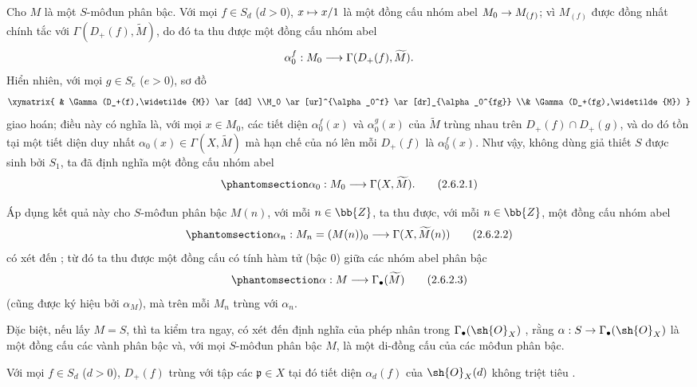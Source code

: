 \documentclass[oneside,10pt]{amsart}
\makeatletter
\newcommand{\ega@arrow}[2]{\mathchoice{#1}{#2}{#2}{#2}}
\let\ega@shortmapsto\mapsto
\renewcommand{\to}{\ega@arrow{\longrightarrow}{\rightarrow}}
\renewcommand{\mapsto}{\ega@arrow{\longmapsto}{\ega@shortmapsto}}
\newcommand{\oldpage}[2][]{\marginnote{\normalfont\footnotesize\textbf{#1}~|~#2}\ignorespaces}
\let\EGAOriginalLabel\label
\renewcommand{\label}[1]{\phantomsection\EGAOriginalLabel{#1}}
\makeatother
\begin{document}
\begin{env}[2.6.2]
\label{II.2.6.2}
Cho $M$ là một $S$-môđun phân bậc.
Với mọi $f\in S_d$ ($d>0$), $x\mapsto x/1$ là một đồng cấu nhóm abel $M_0\to M_{(f)}$; vì $M_{(f)}$ được đồng nhất chính tắc
\oldpage[II]{37}
với $\Gamma(D_+(f),\widetilde{M})$, do đó ta thu được một đồng cấu nhóm abel
\[
  \alpha_0^f:M_0\to\Gamma(D_+(f),\widetilde{M}).
\]
Hiển nhiên, với mọi $g\in S_e$ ($e>0$), sơ đồ
\[
  \xymatrix{
    & \Gamma(D_+(f),\widetilde{M}) \ar[dd]
  \\M_0 \ar[ur]^{\alpha_0^f} \ar[dr]_{\alpha_0^{fg}}
  \\& \Gamma(D_+(fg),\widetilde{M})
  }
\]
giao hoán; điều này có nghĩa là, với mọi $x\in M_0$, các tiết diện $\alpha_0^f(x)$ và $\alpha_0^g(x)$ của $\widetilde{M}$ trùng nhau trên $D_+(f)\cap D_+(g)$, và do đó tồn tại một tiết diện duy nhất $\alpha_0(x)\in\Gamma(X,\widetilde{M})$ mà hạn chế của nó lên mỗi $D_+(f)$ là $\alpha_0^f(x)$.
Như vậy, không dùng giả thiết $S$ được sinh bởi $S_1$, ta đã định nghĩa một đồng cấu nhóm abel
\[
\label{II.2.6.2.1}
  \alpha_0:M_0\to\Gamma(X,\widetilde{M}).
\tag{2.6.2.1}
\]

Áp dụng kết quả này cho $S$-môđun phân bậc $M(n)$, với mỗi $n\in\bb{Z}$, ta thu được, với mỗi $n\in\bb{Z}$, một đồng cấu nhóm abel
\[
\label{II.2.6.2.2}
  \alpha_n:M_n=(M(n))_0\to\Gamma(X,\widetilde{M}(n))
\tag{2.6.2.2}
\]
có xét đến ; từ đó ta thu được một đồng cấu có tính hàm tử (bậc $0$) giữa các nhóm abel phân bậc
\[
\label{II.2.6.2.3}
  \alpha:M\to\Gamma_\bullet(\widetilde{M})
\tag{2.6.2.3}
\]
(cũng được ký hiệu bởi $\alpha_M$), mà trên mỗi $M_n$ trùng với $\alpha_n$.

Đặc biệt, nếu lấy $M=S$, thì ta kiểm tra ngay, có xét đến định nghĩa của phép nhân trong $\Gamma_\bullet(\sh{O}_X)$ , rằng $\alpha:S\to\Gamma_\bullet(\sh{O}_X)$ là một đồng cấu các vành phân bậc và, với mọi $S$-môđun phân bậc $M$,  là một di-đồng cấu của các môđun phân bậc.
\end{env}

\begin{proposition}[2.6.3]
\label{II.2.6.3}
Với mọi $f\in S_d$ ($d>0$), $D_+(f)$ trùng với tập các $\mathfrak{p}\in X$ tại đó tiết diện $\alpha_d(f)$ của $\sh{O}_X(d)$ không triệt tiêu .
\end{proposition}
\end{document}
